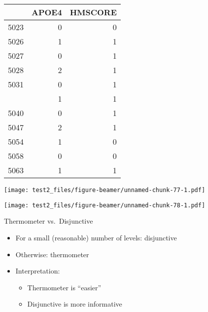\documentclass[
  ignorenonframetext,
]{beamer}
\providecommand{\tightlist}{%
  \setlength{\itemsep}{0pt}\setlength{\parskip}{0pt}}
\begin{document}
\begin{frame}

\begin{table}[H]
\centering\begingroup\fontsize{7}{9}\selectfont

\begin{tabular}{lrr}
\toprule
  & APOE4 & HMSCORE\\
\midrule
5023 & 0 & 0\\
5026 & 1 & 1\\
5027 & 0 & 1\\
5028 & 2 & 1\\
5031 & 0 & 1\\
\addlinespace
5037 & 1 & 1\\
5040 & 0 & 1\\
5047 & 2 & 1\\
5054 & 1 & 0\\
5058 & 0 & 0\\
5063 & 1 & 1\\
\bottomrule
\end{tabular}\endgroup{}
\end{table}

\end{frame}

\begin{frame}

\texttt{[image: test2\_files/figure-beamer/unnamed-chunk-77-1.pdf]}

\end{frame}

\begin{frame}

\texttt{[image: test2\_files/figure-beamer/unnamed-chunk-78-1.pdf]}

\end{frame}

\begin{frame}{Thermometer vs.~Disjunctive}
\protect\hypertarget{thermometer-vs.-disjunctive-1}{}

\begin{itemize}[<+->]
\tightlist
\item
  For a small (reasonable) number of levels: disjunctive
\item
  Otherwise: thermometer
\item
  Interpretation:

  \begin{itemize}[<+->]
  \tightlist
  \item
    Thermometer is ``easier''
  \item
    Disjunctive is more informative
  \end{itemize}
\end{itemize}

\end{frame}
\end{document}
